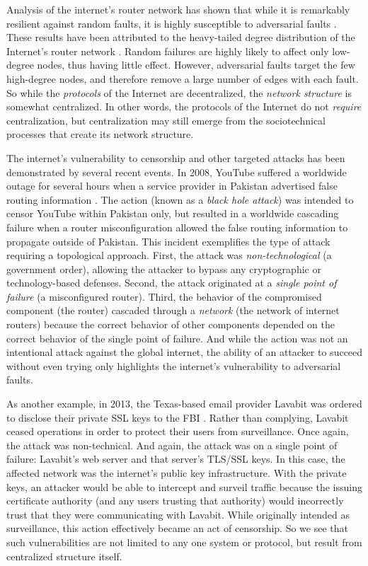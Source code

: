 \documentclass[10pt,letterpaper]{article}
\begin{document}
Analysis of the internet's router network has shown that while it
is remarkably resilient against random faults,
it is highly susceptible to adversarial faults \cite{albert_error_2000}.
These results have been attributed to the heavy-tailed
degree distribution of the Internet's router network
\cite{barabasi_emergence_1999,barabasi_scale-free_2009}.
Random failures are highly likely to affect only low-degree nodes,
thus having little effect.
However, adversarial faults target the few high-degree nodes,
and therefore remove a large number of edges with each fault.
So while the {\em protocols} of the Internet are decentralized,
the {\em network structure} is somewhat centralized. 
In other words, the protocols of the Internet do not {\em require}
centralization, but centralization may still emerge from the sociotechnical
processes that create its network structure.

The internet's vulnerability to censorship and other targeted attacks
has been demonstrated by several recent events.
In 2008, YouTube suffered a worldwide outage for several hours
when a service provider in Pakistan advertised false routing information
\cite{hunter_pakistan_2008}.
The action (known as a {\em black hole attack}) was intended to censor YouTube
within Pakistan only, but resulted in a worldwide cascading failure
when a router misconfiguration allowed the false routing information to
propagate outside of Pakistan.
This incident exemplifies the type of attack requiring a topological approach.
First, the attack was {\em non-technological} (a government order),
allowing the attacker to bypass any cryptographic or technology-based defenses.
Second, the attack originated at a {\em single point of failure}
(a misconfigured router).
Third, the behavior of the compromised component (the router) cascaded
through a {\em network} (the network of internet routers) because the correct
behavior of other components depended on the correct behavior
of the single point of failure.
And while the action was not an intentional attack against the global internet,
the ability of an attacker to succeed without even trying only highlights
the internet's vulnerability to adversarial faults.

As another example, in 2013,
the Texas-based email provider Lavabit was ordered to disclose
their private SSL keys to the FBI \cite{poulsen_edward_2013}.
Rather than complying,
Lavabit ceased operations
in order to protect their users from surveillance.
Once again, the attack was non-technical.
And again, the attack was on a single point of failure:
Lavabit's web server and that server's TLS/SSL keys.
In this case, the affected network was the
internet's public key infrastructure.
With the private keys, an attacker would be able to intercept and
surveil traffic because the issuing certificate authority (and any
users trusting that authority) would incorrectly trust that they were
communicating with Lavabit.
While originally intended as surveillance,
this action effectively became an act of censorship.
So we see that such vulnerabilities are not limited to any one system or protocol,
but result from centralized structure itself.
\end{document}
